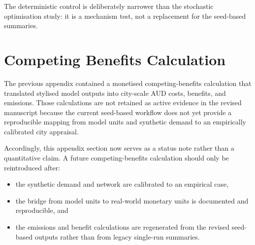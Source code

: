 The deterministic control is deliberately narrower than the stochastic optimisation study: it is a mechanism test, not a replacement for the seed-based summaries.

\section{Competing Benefits Calculation}\label{app:competing-benefits-calculation}
The previous appendix contained a monetised competing-benefits calculation that translated stylised model outputs into city-scale AUD costs, benefits, and emissions. Those calculations are not retained as active evidence in the revised manuscript because the current seed-based workflow does not yet provide a reproducible mapping from model units and synthetic demand to an empirically calibrated city appraisal.

Accordingly, this appendix section now serves as a status note rather than a quantitative claim. A future competing-benefits calculation should only be reintroduced after:

\begin{itemize}
    \item the synthetic demand and network are calibrated to an empirical case,
    \item the bridge from model units to real-world monetary units is documented and reproducible, and
    \item the emissions and benefit calculations are regenerated from the revised seed-based outputs rather than from legacy single-run summaries.
\end{itemize}
